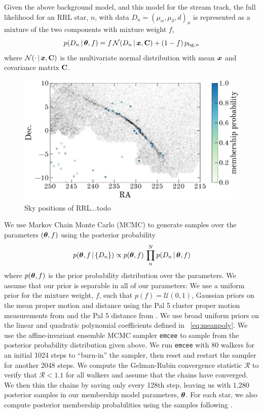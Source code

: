 \documentclass[twocolumn]{aastex63}
\begin{document}
Given the above background model, and this model for the stream track, the full likelihood for an RRL star, $n$, with data $D_n = (\mu_\alpha, \mu_\delta, d)_n$ is represented as a mixture of the two components with mixture weight $f$,
\begin{equation}
    p(D_n \given \bs{\theta}, f) = f \, \mathcal{N}(D_n \given \bs{x}, \mat{C}) + (1-f)\,p_{{\rm bg}, n}
\end{equation}
where $\mathcal{N}(\cdot \,|\, \boldsymbol{x}, \mathbf{C})$ is the multivariate normal distribution with mean $\boldsymbol{x}$ and covariance matrix $\mathbf{C}$.

\begin{figure}[t]
\begin{center}
\includegraphics[width=\textwidth]{members.pdf}
\caption{Sky positions of RRL...todo}
\label{fig:members}
\end{center}
\end{figure}

We use Markov Chain Monte Carlo (MCMC) to generate samples over the parameters $(\boldsymbol{\theta}, f)$ using the posterior probability
\begin{equation}
    p(\bs{\theta}, f \given \{D_n\}) \propto p(\bs{\theta}, f) \, \prod_n^N p(D_n \given \bs{\theta}, f)
\end{equation}
where $p(\boldsymbol{\theta}, f)$ is the prior probability distribution over the parameters.
We assume that our prior is separable in all of our parameters: We use a uniform prior for the mixture weight, $f$, such that $p(f) = \mathcal{U}(0, 1)$, Gaussian priors on the mean proper motion and distance using the Pal 5 cluster proper motion measurements from \citet{Vasiliev:2019} and the Pal 5 distance from \citet{Kuepper:2015}.
We use broad uniform priors on the linear and quadratic polynomial coefficients defined in \equationname~\ref{eq:meanpoly}.
We use the affine-invariant ensemble MCMC sampler \texttt{emcee} \citep{emcee} to sample from the posterior probability distribution given above.
We run \texttt{emcee} with 80 walkers for an initial 1024 steps to ``burn-in'' the sampler, then reset and restart the sampler for another 2048 steps.
We compute the Gelman-Rubin convergence statistic $\mathcal{R}$ \citep{Gelman:1992} to verify that $\mathcal{R} < 1.1$ for all walkers and assume that the chains have converged.
We then thin the chains by saving only every 128th step, leaving us with 1,280 posterior samples in our membership model parameters, $\boldsymbol{\theta}$.
For each star, we also compute posterior membership probabilities using the samples following \citet{DFM:blog}.
\end{document}
